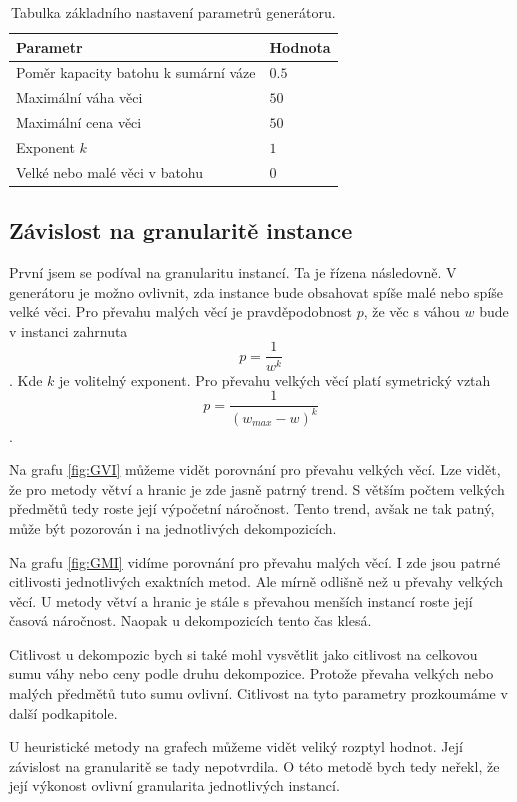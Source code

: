 \documentclass[11pt]{article}
\begin{document}
\begin{table}[h]
\centering
    \begin{tabular}{ |l|l| } 
        \hline
        Parametr & Hodnota \\
        \hline
        \hline
        Poměr kapacity batohu k sumární váze & $0.5$ \\
        Maximální váha věci & $50$ \\
        Maximální cena věci & $50$ \\
        Exponent $k$ & $1$ \\
        Velké nebo malé věci v batohu & $0$ \\
        \hline
    \end{tabular}
    \caption{Tabulka základního nastavení parametrů generátoru.}\label{tab:GVI}
\end{table} 
 


\subsection{Závislost na granularitě instance}
První jsem se podíval na granularitu instancí. Ta je řízena následovně. V generátoru je možno ovlivnit, zda instance bude obsahovat spíše malé nebo spíše velké věci. Pro převahu malých věcí je pravděpodobnost $p$, že věc s váhou $w$ bude v instanci zahrnuta $$ p=\frac{1 }{ w^k}$$. Kde $k$ je volitelný exponent. Pro převahu velkých věcí platí symetrický vztah $$ p=\frac{1}  {(w_{max}-w)^k}$$.

Na grafu \ref{fig:GVI} můžeme vidět porovnání pro převahu velkých věcí. Lze vidět, že pro metody větví a hranic je zde jasně patrný trend. S větším počtem velkých předmětů tedy roste její výpočetní náročnost. Tento trend, avšak ne tak patný, může být pozorován i na jednotlivých dekompozicích. 

Na grafu \ref{fig:GMI} vidíme porovnání pro převahu malých věcí. I zde jsou patrné citlivosti jednotlivých exaktních metod. Ale mírně odlišně než u převahy velkých věcí. U metody větví a hranic je stále s převahou menších instancí roste její časová náročnost. Naopak u dekompozicích tento čas klesá. 

Citlivost u dekompozic bych si také mohl vysvětlit jako citlivost na celkovou sumu váhy nebo ceny podle druhu dekompozice. Protože převaha velkých nebo malých předmětů tuto sumu ovlivní. Citlivost na tyto parametry prozkoumáme v další podkapitole.

U heuristické metody na grafech můžeme vidět veliký rozptyl hodnot. Její závislost na granularitě se tady nepotvrdila. O této metodě bych tedy neřekl, že její výkonost ovlivní granularita jednotlivých instancí.
\end{document}
